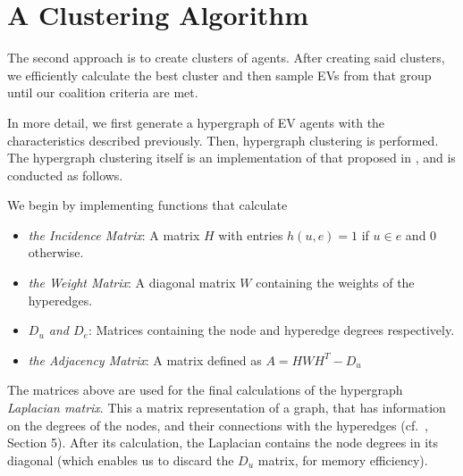 \section{A Clustering Algorithm}\label{sec:Clustering}
The second approach is to create clusters of agents. After creating said clusters, we efficiently calculate the best cluster and then sample EVs from that group until our coalition criteria are met.

In more detail, we first generate a hypergraph of EV agents with the characteristics described previously. Then, hypergraph clustering is performed.
The hypergraph clustering itself is an implementation of that proposed in \cite{zhou2006learning}, and is conducted as follows. 	%

We begin by implementing functions that calculate
\begin{itemize}
	\item{\em the Incidence Matrix}: A %
	matrix $H$ with entries $h(u,e) = 1$ if $u \in e$ and $0$ otherwise.
	\item{\em the Weight Matrix}: A diagonal matrix $W$ containing the weights of the hyperedges.
	\item{\em $D_u$ and $D_e$}: Matrices containing the node and hyperedge degrees respectively.
	\item{\em the Adjacency Matrix}: A matrix defined as $A = HWH^T - D_u$
\end{itemize}
The matrices above are used for the final calculations of the hypergraph \textit{Laplacian matrix}. This a matrix representation of a graph, that has information on the degrees of the nodes, and their connections with the hyperedges (cf.~\cite{zhou2006learning}, Section 5). 
After its calculation, the Laplacian contains the node degrees in its diagonal (which enables us to discard the $D_u$ matrix, for memory efficiency).

